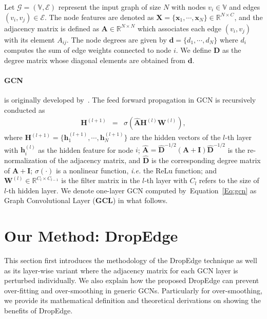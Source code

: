\documentclass{article}
\def\Eqref#1{Equation~\ref{#1}}
\def\vd{{\bm{d}}}
\def\vh{{\bm{h}}}
\def\vx{{\bm{x}}}
\def\mA{{\bm{A}}}
\def\mD{{\bm{D}}}
\def\mH{{\bm{H}}}
\def\mI{{\bm{I}}}
\def\mW{{\bm{W}}}
\def\mX{{\bm{X}}}
\def\gG{{\mathcal{G}}}
\def\sV{{\mathbb{V}}}
\newcommand{\R}{\mathbb{R}}
\begin{document}
Let  $\gG=(\sV, \mathcal{E})$ represent the input graph of size $N$ with nodes $v_i\in\sV$ and edges $(v_i, v_j)\in\mathcal{E}$. The node features are denoted as $\mX=\{\vx_1,\cdots,\vx_N\}\in\R^{N\times C}$, and the adjacency matrix is defined as $\mA\in\R^{N\times N}$ which associates each edge $(v_i, v_j)$ with its element $A_{ij}$. The node degrees are given by $\vd=\{d_1,\cdots,d_N\}$ where $d_i$ computes the sum of edge weights connected to node $i$. We define $\mD$ as the degree matrix whose diagonal elements are obtained from $\vd$.




\paragraph{GCN}
is originally developed by~\citet{Kipf2017}. The feed forward propagation in GCN is recursively conducted as
\vskip -0.25in
\begin{eqnarray}
\label{Eq:gcn}
\mH^{(l+1)} &=& \sigma\left(\hat{\mA}\mH^{(l)}\mW^{(l)}\right),
\end{eqnarray}
\vskip -0.1in
where $\mH^{(l+1)}=\{\vh_1^{(l+1)},\cdots,\vh_N^{(l+1)}\}$ are the hidden vectors of the $l$-th layer with $\vh_i^{(l)}$ as the hidden feature for node $i$; $\hat{\mA}=\hat{\mD}^{-1/2}(\mA+\mI)\hat{\mD}^{-1/2}$ is the re-normalization of the adjacency matrix, and $\hat{\mD}$ is the corresponding degree matrix of $\mA+\mI$; $\sigma(\cdot)$ is a nonlinear function, \emph{i.e.} the ReLu function; and $\mW^{(l)}\in\mathbb{R}^{C_l \times C_{l-1}}$ is the filter matrix in the $l$-th layer with $C_l$ refers to the size of $l$-th hidden layer. We denote one-layer GCN computed by~\Eqref{Eq:gcn} as Graph Convolutional Layer (\textbf{GCL}) in what follows.


\section{Our Method: DropEdge}

This section first introduces the methodology of the DropEdge technique as well as its layer-wise variant where the adjacency matrix for each GCN layer is perturbed individually. We also explain how the proposed DropEdge can prevent over-fitting and over-smoothing in generic GCNs. Particularly for over-smoothing, we provide its mathematical definition and theoretical derivations on showing the benefits of DropEdge.
\end{document}
